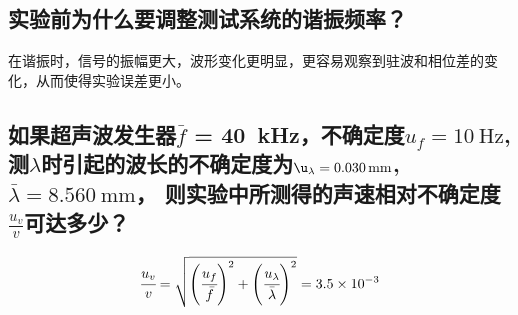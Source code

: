 \documentclass{../../templates/Report}
\begin{document}
\begin{fullreportonly}
	\subsection{实验前为什么要调整测试系统的谐振频率？}
	在谐振时，信号的振幅更大，波形变化更明显，更容易观察到驻波和相位差的变化，从而使得实验误差更小。
	\subsection{如果超声波发生器$\bar{f}$ = \SI{40}{\kilo\hertz}，不确定度$u_f = \SI{10}{\hertz}$, 测$\lambda$时引起的波长的不确定度为$\u_{\lambda} = \SI{0.030}{\mm}$, $\bar{\lambda} = \SI{8.560}{\mm}$， 则实验中所测得的声速相对不确定度$\frac{u_v}{v}$可达多少？}
	\begin{equation*}
		\cfrac{u_v}{v}  = \sqrt{\left(\cfrac{u_f}{\bar{f}}\right)^2 + \left(\cfrac{u_{\lambda}}{\bar{\lambda}}\right)^2} = 3.5 \times 10^{-3}
	\end{equation*}

\end{fullreportonly}

\insertnotes
\end{document}
